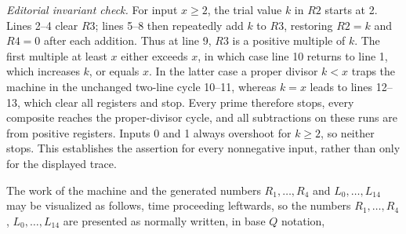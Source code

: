 \documentclass[11pt,leqno]{article}
\begin{document}
\noindent\textit{Editorial invariant check.} For input $x\geq2$, the trial value $k$ in $R2$ starts at 2. Lines 2--4 clear $R3$; lines 5--8 then repeatedly add $k$ to $R3$, restoring $R2=k$ and $R4=0$ after each addition. Thus at line 9, $R3$ is a positive multiple of $k$. The first multiple at least $x$ either exceeds $x$, in which case line 10 returns to line 1, which increases $k$, or equals $x$. In the latter case a proper divisor $k<x$ traps the machine in the unchanged two-line cycle 10--11, whereas $k=x$ leads to lines 12--13, which clear all registers and stop. Every prime therefore stops, every composite reaches the proper-divisor cycle, and all subtractions on these runs are from positive registers. Inputs 0 and 1 always overshoot for $k\geq2$, so neither stops. This establishes the assertion for every nonnegative input, rather than only for the displayed trace.

The work of the machine and the generated numbers $R_{1}, \ldots, R_{4}$ and $L_{0}, \ldots, L_{14}$ may be visualized as follows, time proceeding leftwards, so the numbers $R_{1}, \ldots, R_{4}$, $L_{0}, \ldots, L_{14}$ are presented as normally written, in base $Q$ notation,
\end{document}
